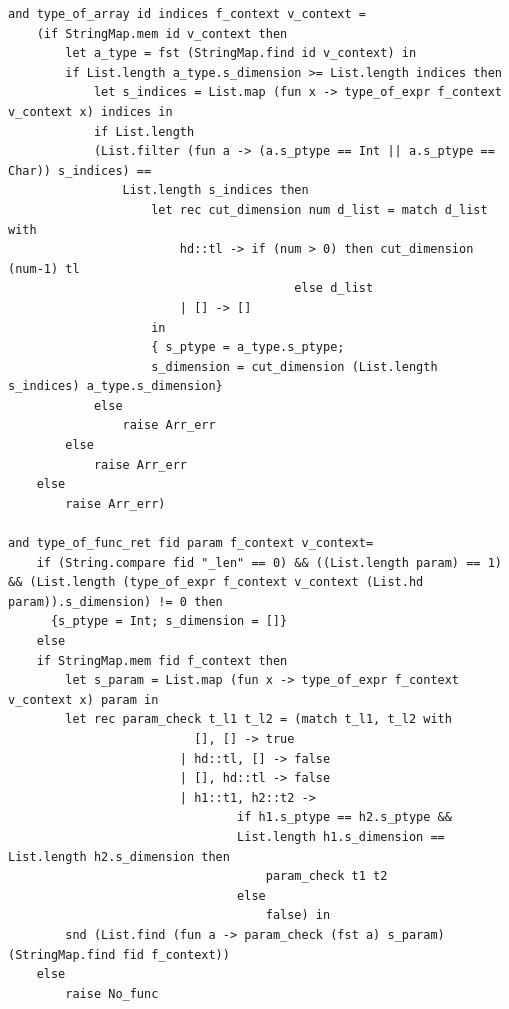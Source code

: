 \documentclass[a4paper,12pt]{article}
\begin{document}
\begin{lstlisting}
and type_of_array id indices f_context v_context = 
    (if StringMap.mem id v_context then
        let a_type = fst (StringMap.find id v_context) in
        if List.length a_type.s_dimension >= List.length indices then
            let s_indices = List.map (fun x -> type_of_expr f_context v_context x) indices in
            if List.length 
            (List.filter (fun a -> (a.s_ptype == Int || a.s_ptype == Char)) s_indices) == 
                List.length s_indices then
                    let rec cut_dimension num d_list = match d_list with
                        hd::tl -> if (num > 0) then cut_dimension (num-1) tl
                                        else d_list
                        | [] -> []
                    in
                    { s_ptype = a_type.s_ptype; 
                    s_dimension = cut_dimension (List.length s_indices) a_type.s_dimension}  
            else
                raise Arr_err
        else
            raise Arr_err
    else
        raise Arr_err)

and type_of_func_ret fid param f_context v_context= 
    if (String.compare fid "_len" == 0) && ((List.length param) == 1) && (List.length (type_of_expr f_context v_context (List.hd param)).s_dimension) != 0 then
      {s_ptype = Int; s_dimension = []}
    else
    if StringMap.mem fid f_context then
        let s_param = List.map (fun x -> type_of_expr f_context v_context x) param in
        let rec param_check t_l1 t_l2 = (match t_l1, t_l2 with
                          [], [] -> true
                        | hd::tl, [] -> false
                        | [], hd::tl -> false
                        | h1::t1, h2::t2 -> 
                                if h1.s_ptype == h2.s_ptype &&
                                List.length h1.s_dimension == List.length h2.s_dimension then
                                    param_check t1 t2
                                else
                                    false) in
        snd (List.find (fun a -> param_check (fst a) s_param) (StringMap.find fid f_context))
    else
        raise No_func



\end{lstlisting}
\end{document}
